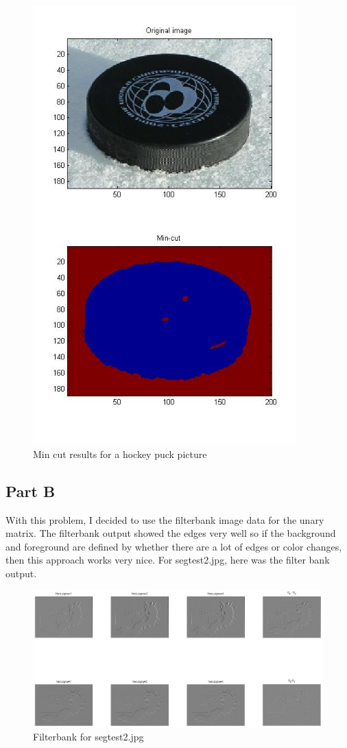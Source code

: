 \documentclass[11pt,psfig]{article}
\begin{document}
\begin{figure}[H]
\centering
\includegraphics[width=4in]{prob5plotA_3.jpg}
\caption{Min cut results for a hockey puck picture}
\end{figure}

\subsection*{Part B}

With this problem, I decided to use the filterbank image data for the unary matrix. The filterbank output showed the edges very well so if the background and foreground are defined by whether there are a lot of edges or color changes, then this approach works very nice. For segtest2.jpg, here was the filter bank output. 

\begin{figure}[H]
\centering
\includegraphics[width=6in]{prob5plotB_1_filter.jpg}
\caption{Filterbank for segtest2.jpg}
\end{figure}
\end{document}
